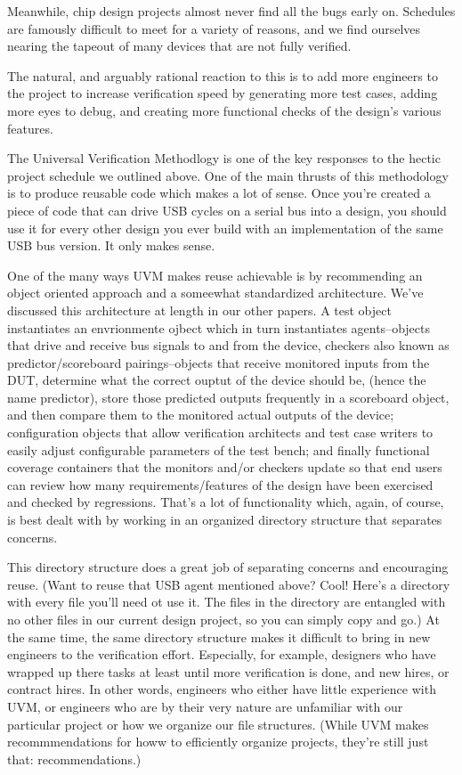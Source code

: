 \documentclass[twocolumn,letterpaper]{IEEEAerospaceCLS}  %
\begin{document}
Meanwhile, chip design projects almost never find all the bugs early on. Schedules are famously difficult to meet for a variety of reasons, and we find ourselves nearing the tapeout of many devices that are not fully verified. 

The natural, and arguably rational reaction to this is to add more engineers to the project to increase verification speed by generating more test cases, adding more eyes to debug, and creating more functional checks of the design's various features.

The Universal Verification Methodlogy is one of the key responses to the hectic project schedule we outlined above. One of the main thrusts of this methodology is to produce reusable code which makes a lot of sense. Once you're created a piece of code that can drive USB cycles on a serial bus into a design, you should use it for every other design you ever build with an implementation of the same USB bus version. It only makes sense. 

One of the many ways UVM makes reuse achievable is by recommending an object oriented approach and a someewhat standardized architecture. We've discussed this architecture at length in our other papers. A test object instantiates an envrionmente ojbect which in turn instantiates agents--objects that drive and receive bus signals to and from the device, checkers also known as predictor/scoreboard pairings--objects that receive monitored inputs from the DUT, determine what the correct ouptut of the device should be, (hence the name predictor), store those predicted outputs frequently in a scoreboard object, and then compare them to the monitored actual outputs of the device; configuration objects that allow verification architects and test case writers to easily adjust configurable parameters of the test bench; and finally functional coverage containers that the monitors and/or checkers update so that end users can review how many requirements/features of the design have been exercised and checked by regressions. That's a lot of functionality which, again, of course, is best dealt with by working in an organized directory structure that separates concerns.

This directory structure does a great job of separating concerns and encouraging reuse. (Want to reuse that USB agent mentioned above? Cool! Here's a directory with every file you'll need ot use it. The files in the directory are entangled with no other files in our current design project, so you can simply copy and go.) At the same time, the same directory structure makes it difficult to bring in new engineers to the verification effort. Especially, for example, designers who have wrapped up there tasks at least until more verification is done, and new hires, or contract hires. In other words, engineers who either have little experience with UVM, or engineers who are by their very nature are unfamiliar with our particular project or how we organize our file structures. (While UVM makes recommmendations for howw to efficiently organize projects, they're still just that: recommendations.)
\end{document}
